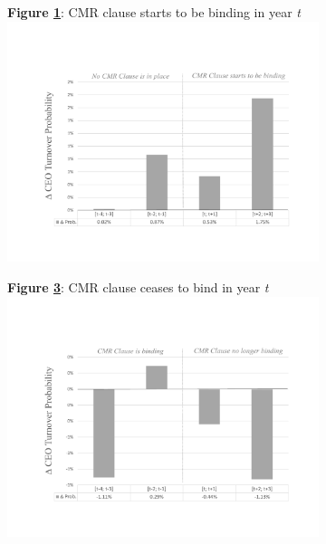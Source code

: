 \documentclass[a4paper,12pt]{article}
\begin{document}
\begin{singlespace}
\begin{figure}[ht]
     \skipline
     \centering
     \begin{subfigure}[b]{\textwidth}  \label{fig:turnover_pre}
     	\centering \normalsize
     	\textbf{Figure \ref{fig:turnover_pre}}:  CMR clause starts to be binding in year \textit{t}
     	\includegraphics[trim=2cm 2cm 2cm 4cm,clip=true,width=12cm,keepaspectratio]{./figures/cmr_start.pdf}
     \end{subfigure}

     \skipline \skipline
     \begin{subfigure}[b]{\textwidth}  \label{fig:turnover_post}
     	\centering \normalsize
     	\textbf{Figure \ref{fig:turnover_post}}:  CMR clause ceases to bind in year \textit{t}
     	\includegraphics[trim=2cm 2cm 2cm 4cm,clip=true,width=12cm,keepaspectratio]{./figures/cmr_end.pdf}
     \end{subfigure}

\end{figure}
\egroup




\end{singlespace}
\end{document}
